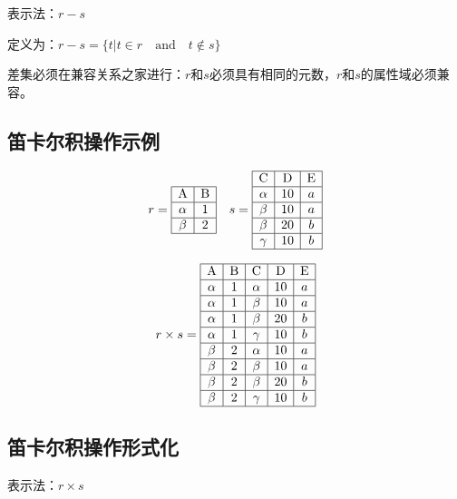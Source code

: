 表示法：$r-s$

定义为：$r-s=\{t|t\in r\quad \text{and}\quad t\notin s\}$

差集必须在兼容关系之家进行：$r$和$s$必须具有相同的元数，$r$和$s$的属性域必须兼容。

\subsection{笛卡尔积操作示例}

\[
r=\begin{array}{|c|c|}
    \hline
    \mathrm{A} & \mathrm{B} \\ \hline
    \alpha & 1 \\ \hline
    \beta & 2 \\ \hline
\end{array}
\quad
s=\begin{array}{|c|c|c|}
    \hline
    \mathrm{C} & \mathrm{D} & \mathrm{E} \\ \hline
    \alpha & 10 & a\\ \hline
    \beta & 10 & a\\ \hline
    \beta & 20 & b\\ \hline
    \gamma & 10 & b\\ \hline
\end{array}
\]

\[
r\times s = \begin{array}{|c|c|c|c|c|}
    \hline
    \mathrm{A} & \mathrm{B} & \mathrm{C} & \mathrm{D} & \mathrm{E} \\ \hline
    \alpha & 1 & \alpha & 10 & a \\ \hline
    \alpha & 1 & \beta & 10 & a \\ \hline
    \alpha & 1 & \beta & 20 & b\\ \hline
    \alpha & 1 & \gamma & 10 & b\\ \hline
    \beta & 2 & \alpha & 10 & a\\ \hline
    \beta & 2 & \beta & 10 & a \\ \hline
    \beta & 2 & \beta & 20 & b\\ \hline
    \beta & 2 & \gamma & 10 & b\\ \hline
\end{array}
\]

\subsection{笛卡尔积操作形式化}

表示法：$r\times s$

